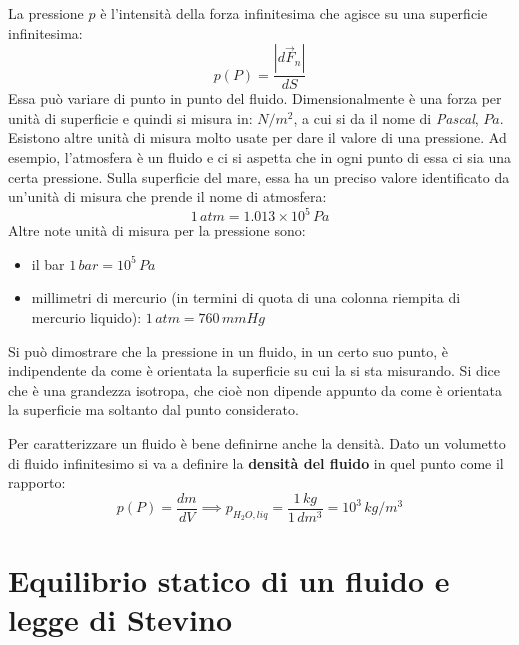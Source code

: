 \documentclass[10pt,a4paper]{book}
\begin{document}
La pressione $p$ è l'intensità della forza infinitesima che agisce su una superficie infinitesima:
\[
	p(P) = \frac{|d\vec{F}_n|}{dS}
\]
Essa può variare di punto in punto del fluido. Dimensionalmente è una forza per unità di superficie e quindi si misura in: $N/m^2$, a cui si da il nome di \emph{Pascal}, $Pa$. Esistono altre unità di misura molto usate per dare il valore di una pressione. Ad esempio, l'atmosfera è un fluido e ci si aspetta che in ogni punto di essa ci sia una certa pressione. Sulla superficie del mare, essa ha un preciso valore identificato da un'unità di misura che prende il nome di atmosfera:
\[
	1\,atm = 1.013 \times 10^5\,Pa
\]
Altre note unità di misura per la pressione sono:
\begin{itemize}
	\item il bar $1\,bar = 10^5\,Pa$
	\item millimetri di mercurio (in termini di quota di una colonna riempita di mercurio liquido): $1\,atm = 760\,mmHg$
\end{itemize}
Si può dimostrare che la pressione in un fluido, in un certo suo punto, è indipendente da come è orientata la superficie su cui la si sta misurando. Si dice che è una grandezza isotropa, che cioè non dipende appunto da come è orientata la superficie ma soltanto dal punto considerato.

Per caratterizzare un fluido è bene definirne anche la densità. Dato un volumetto di fluido infinitesimo si va a definire la \textbf{densità del fluido} in quel punto come il rapporto:
\[
	p(P) = \frac{dm}{dV} \implies p_{H_2 O, liq } = \frac{1\,kg}{1\,dm^3 } = 10^3\,kg/m^3
\]







































\section{Equilibrio statico di un fluido e legge di Stevino}
\end{document}
